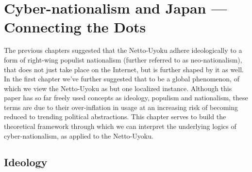 \documentclass[10pt,british,A4paper,,openany]{memoir}
\begin{document}
\chapter{Cyber-nationalism and Japan --- Connecting the
Dots}\label{cyber-nationalism-and-japan-connecting-the-dots}

The previous chapters suggested that the Netto-Uyoku adhere
ideologically to a form of right-wing populist nationalism (further
referred to as neo-nationalism), that does not just take place on the
Internet, but is further shaped by it as well. In the first chapter
we've further suggested that to be a global phenomenon, of which we view
the Netto-Uyoku as but one localized instance. Although this paper has
so far freely used concepts as ideology, populism and nationalism, these
terms are due to their over-inflation in usage at an increasing risk of
becoming reduced to trending political abstractions. This chapter serves
to build the theoretical framework through which we can interpret the
underlying logics of cyber-nationalism, as applied to the Netto-Uyoku.

\section{Ideology}\label{ideology}
\end{document}
